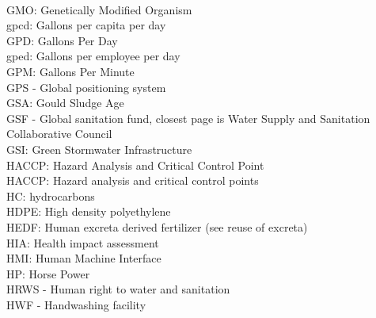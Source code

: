 \documentclass{article}
\begin{document}
\vspace{0.3cm}\\
GMO:  Genetically Modified Organism
\vspace{0.3cm}\\
gpcd:  Gallons per capita per day
\vspace{0.3cm}\\
GPD:  Gallons Per Day
\vspace{0.3cm}\\
gped:  Gallons per employee per day
\vspace{0.3cm}\\
GPM:  Gallons Per Minute
\vspace{0.3cm}\\
GPS - Global positioning system
\vspace{0.3cm}\\
GSA:  Gould Sludge Age
\vspace{0.3cm}\\
GSF - Global sanitation fund, closest page is Water Supply and Sanitation Collaborative Council
\vspace{0.3cm}\\
GSI:  Green Stormwater Infrastructure
\vspace{0.3cm}\\
HACCP:  Hazard Analysis and Critical Control Point
\vspace{0.3cm}\\
HACCP:  Hazard analysis and critical control points
\vspace{0.3cm}\\
HC:  hydrocarbons
\vspace{0.3cm}\\
HDPE:  High density polyethylene
\vspace{0.3cm}\\
HEDF:  Human excreta derived fertilizer (see reuse of excreta)
\vspace{0.3cm}\\
HIA:  Health impact assessment
\vspace{0.3cm}\\
HMI:  Human Machine Interface  
\vspace{0.3cm}\\
HP:  Horse Power
\vspace{0.3cm}\\
HRWS - Human right to water and sanitation
\vspace{0.3cm}\\
HWF - Handwashing facility
\vspace{0.3cm}\\
\end{document}

